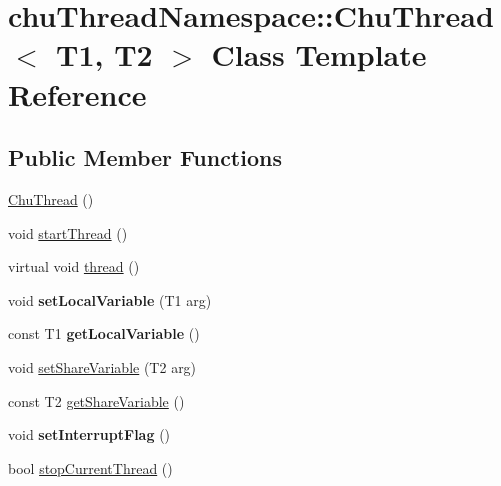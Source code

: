 \hypertarget{classchu_thread_namespace_1_1_chu_thread}{\section{chu\-Thread\-Namespace\-:\-:Chu\-Thread$<$ T1, T2 $>$ Class Template Reference}
\label{classchu_thread_namespace_1_1_chu_thread}
}
\subsection*{Public Member Functions}
\begin{DoxyCompactItemize}
\item 
\hyperlink{classchu_thread_namespace_1_1_chu_thread_a9fc3a821c0969a7dcaaf5b4e9c62365c}{Chu\-Thread} ()
\item 
void \hyperlink{classchu_thread_namespace_1_1_chu_thread_a0c9ac5b4b19ae1ce58f14dc180f845ad}{start\-Thread} ()
\item 
virtual void \hyperlink{classchu_thread_namespace_1_1_chu_thread_a3043a3b3a99b5e96a0ce2e4591fdb0cf}{thread} ()
\item 
\hypertarget{classchu_thread_namespace_1_1_chu_thread_a910489dcf014618f45c7091f9df8454c}{void {\bfseries set\-Local\-Variable} (T1 arg)}\label{classchu_thread_namespace_1_1_chu_thread_a910489dcf014618f45c7091f9df8454c}

\item 
\hypertarget{classchu_thread_namespace_1_1_chu_thread_a3b5dc1ef661f2f796f21b5201bcd962a}{const T1 {\bfseries get\-Local\-Variable} ()}\label{classchu_thread_namespace_1_1_chu_thread_a3b5dc1ef661f2f796f21b5201bcd962a}

\item 
void \hyperlink{classchu_thread_namespace_1_1_chu_thread_a263626e9fbb344f14da6f30e7b277639}{set\-Share\-Variable} (T2 arg)
\item 
const T2 \hyperlink{classchu_thread_namespace_1_1_chu_thread_a611c714a581e0c07b73b0680564ba866}{get\-Share\-Variable} ()
\item 
\hypertarget{classchu_thread_namespace_1_1_chu_thread_adf36076d451d88a938af87e2f6172b9d}{void {\bfseries set\-Interrupt\-Flag} ()}\label{classchu_thread_namespace_1_1_chu_thread_adf36076d451d88a938af87e2f6172b9d}

\item 
bool \hyperlink{classchu_thread_namespace_1_1_chu_thread_a67c6c5e21f2aa7ba25e00cba05987cc6}{stop\-Current\-Thread} ()
\end{DoxyCompactItemize}

